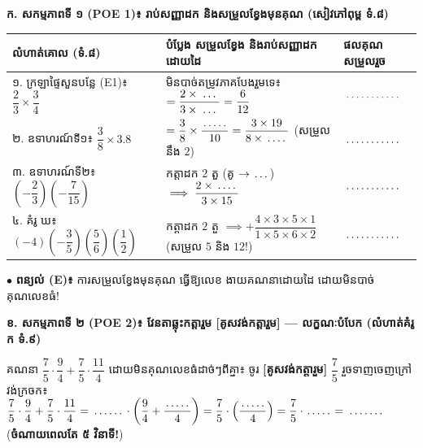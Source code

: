 \documentclass[a4paper,10pt]{article}
\newcommand{\en}[1]{{\TimesEn #1}}
\newcommand{\blank}[1][1.5cm]{\makebox[#1]{\dotfill}}
\begin{document}
\vspace{4pt}
\textbf{ក. សកម្មភាពទី ១ (\en{POE 1})៖ រាប់សញ្ញាដក និងសម្រួលខ្វែងមុនគុណ (សៀវភៅពុម្ព ទំ.៨)}

{\renewcommand{\arraystretch}{1.58}
\begin{tabular}{|L{4.80cm}|L{8.80cm}|C{4.20cm}|}
  \hline
  \textbf{លំហាត់គោល (ទំ.៨)} & \textbf{បំប្លែង សម្រួលខ្វែង និងរាប់សញ្ញាដកដោយដៃ} & \textbf{ផលគុណសម្រួលរួច} \\
  \hline
  ១. ក្រឡាផ្ទៃសួនបន្លែ (\en{E1})៖ $\dfrac{2}{3}\times\dfrac{3}{4}$ & មិនបាច់តម្រូវភាគបែងរួមទេ៖ $=\dfrac{2\times\blank[0.6cm]}{3\times\blank[0.6cm]} = \dfrac{6}{12}$ & $\blank[1.8cm]$ \\
  \hline
  ២. ឧទាហរណ៍ទី១៖ $\dfrac{3}{8}\times 3.8$ & $=\dfrac{3}{8}\times\dfrac{\blank[0.8cm]}{10} = \dfrac{3\times 19}{8\times \blank[0.7cm]}$ (សម្រួលនឹង $2$) & $\blank[1.8cm]$ \\
  \hline
  ៣. ឧទាហរណ៍ទី២៖ $\left(-\dfrac{2}{3}\right)\left(-\dfrac{7}{15}\right)$ & កត្តាដក $2$ តួ (គូ $\to \blank[0.5cm]$) $\implies \dfrac{2\times \blank[0.7cm]}{3\times 15}$ & $\blank[1.8cm]$ \\
  \hline
  ៤. គំរូ ឃ៖ $(-4)\left(-\dfrac{3}{5}\right)\left(\dfrac{5}{6}\right)\left(\dfrac{1}{2}\right)$ & កត្តាដក $2$ តួ $\implies +\dfrac{4\times 3\times 5\times 1}{1\times 5\times 6\times 2}$ (សម្រួល $5$ និង $12$!) & $\blank[1.8cm]$ \\
  \hline
\end{tabular}}

\vspace{4pt}
$\bullet$ \textbf{ពន្យល់ (\en{E})៖} ការសម្រួលខ្វែងមុនគុណ ធ្វើឱ្យលេខ \blank[1.8cm] ងាយគណនាដោយដៃ ដោយមិនបាច់គុណលេខធំ!

\vspace{4pt}
\textbf{ខ. សកម្មភាពទី ២ (\en{POE 2})៖ វែនតាឆ្លុះកត្តារួម \textbf{[គូសវង់កត្តារួម]} — លក្ខណៈបំបែក (លំហាត់គំរូ ក ទំ.៩)}

\begin{tcolorbox}[enhanced, sharp corners, colback=white, colframe=black, boxrule=0.7pt, boxsep=2pt, top=2.5pt, bottom=2.5pt, left=5pt, right=5pt]
  គណនា $\dfrac{7}{5}\cdot\dfrac{9}{4} + \dfrac{7}{5}\cdot\dfrac{11}{4}$ ដោយមិនគុណលេខធំដាច់ៗពីគ្នា៖ ចូរ \textbf{[គូសវង់កត្តារួម]} $\dfrac{7}{5}$ រួចទាញចេញក្រៅវង់ក្រចក៖\\[3pt]
  $\dfrac{7}{5}\cdot\dfrac{9}{4} + \dfrac{7}{5}\cdot\dfrac{11}{4} = \blank[1.0cm]\cdot\left(\dfrac{9}{4} + \dfrac{\blank[0.8cm]}{4}\right) = \dfrac{7}{5}\cdot\left(\dfrac{\blank[0.8cm]}{4}\right) = \dfrac{7}{5}\cdot\blank[0.8cm] = \blank[1.2cm]$ \quad (\textbf{ចំណាយពេលតែ ៥ វិនាទី!})
\end{tcolorbox}
\end{document}
